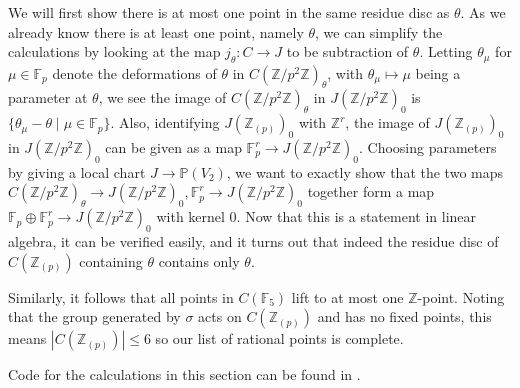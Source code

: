 \documentclass[12pt]{article}
\newcommand{\Z}{\mathbb{Z}}
\renewcommand{\P}{\mathbb{P}}
\newcommand{\F}{\mathbb{F}}
\theoremstyle{plain}
\theoremstyle{definition}
\theoremstyle{remark}
\begin{document}
We will first show there is at most one point in the same residue disc as $\theta$. As we already know there is at least one point, namely $\theta$, we can simplify the calculations by looking at the map $j_{\theta}: C \to J$ to be subtraction of $\theta$. Letting $\theta_{\mu}$ for $\mu \in \F_p$ denote the deformations of $\theta$ in $C(\Z/p^2\Z)_{\theta}$, with $\theta_\mu \mapsto \mu$ being a parameter at $\theta$, we see the image of $C(\Z/p^2\Z)_\theta$ in $J(\Z/p^2\Z)_0$ is $\{\theta_\mu - \theta \mid \mu \in \F_p\}$. Also, identifying $J(\Z_{(p)})_0$ with $\Z^r$, the image of $J(\Z_{(p)})_0$ in $J(\Z/p^2\Z)_0$ can be given as a map $\F_p^r \to J(\Z/p^2\Z)_0$. Choosing parameters by giving a local chart $J \to \P(V_2)$, we want to exactly show that the two maps $C(\Z/p^2\Z)_\theta \to J(\Z/p^2\Z)_0, \F_p^r \to J(\Z/p^2\Z)_0$ together form a map $\F_p \oplus \F_p^r \to J(\Z/p^2\Z)_0$ with kernel $0$. Now that this is a statement in linear algebra, it can be verified easily, and it turns out that indeed the residue disc of $C(\Z_{(p)})$ containing $\theta$ contains only $\theta$.

Similarly, it follows that all points in $C(\F_5)$ lift to at most one $\Z$-point. Noting that the group generated by $\sigma$ acts on $C(\Z_{(p)})$ and has no fixed points, this means $|C(\Z_{(p)})| \leq 6$ so our list of rational points is complete.

Code for the calculations in this section can be found in \cite{spelier2020}.

\newpage


\end{document}

